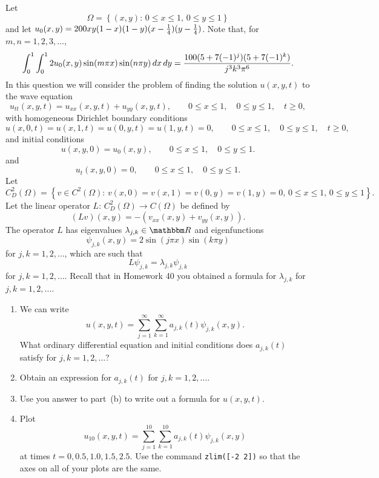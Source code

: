 Let
\[
\Omega=\left\{(x,y):\,0\le x\le 1,\,0\le y\le 1\right\}
\]
and let $u_0(x,y) = 200xy (1-x) (1-y)(x-{1 \over 4})(y-{1 \over 4})$. Note that, for $m,n=1,2,3,\ldots$,
\[
\int_0^1 \int_0^1 2 u_0(x,y) \sin(m \pi x) \sin(n \pi y)\,dx\,dy= {100 (5+7(-1)^j)(5+7(-1)^k)\over j^3 k^3 \pi^6}.
\]
In this question we will consider the problem of finding the solution $u(x,y,t)$ to the wave equation
\[ 
u_{tt}(x,y,t)=u_{xx}(x,y,t) +u_{yy}(x,y,t), \qquad 0\le x \le 1, \quad 0\le y\le 1, \quad t\ge 0,
\]
with homogeneous Dirichlet boundary conditions
\[
u(x,0,t)=u(x,1,t)=u(0,y,t)=u(1,y,t)=0, \qquad 0\le x \le 1, \quad 0\le y\le 1, \quad t\ge 0,
\]
and initial conditions
\[
u(x,y,0) = u_0(x,y), \qquad 0\le x\le 1, \quad 0\le y\le 1.
\]
and
\[
u_t(x,y,0) = 0, \qquad 0\le x\le 1, \quad 0\le y\le 1.
\]
Let
\[
C^2_D(\Omega)=\left\{v\in C^2(\Omega):\,v(x,0)=v(x,1)=v(0,y)=v(1,y)=0,\,0\le x\le 1,\,0\le y\le 1\right\}.
\]
Let the linear operator $L:\,C^2_D(\Omega)\rightarrow C(\Omega)$ be defined by
\[
\left(L v\right)(x,y) = -\left(v_{xx}(x,y) + v_{yy}(x,y)\right).
\]
The operator $L$ has eigenvalues $\lambda_{j,k}\in\R$ and eigenfunctions
\[
\psi_{j,k}(x,y) = 2 \sin(j \pi x) \sin(k \pi y)
\]
for $j,k = 1,2,\ldots$, which are such that
\[
L\psi_{j,k}=\lambda_{j,k}\psi_{j,k}
\]
for $j,k = 1,2,\ldots$. Recall that in Homework 40 you obtained a formula for $\lambda_{j,k}$ for $j,k = 1,2,\ldots$.

\begin{enumerate}
\item We can write
\[
u(x,y,t)=\sum_{j=1}^\infty \sum_{k=1}^\infty a_{j,k}(t) \psi_{j,k}(x,y).
\]
What ordinary differential equation and initial conditions does $a_{j,k}(t)$ satisfy for $j,k = 1,2,\ldots$?
\\
\item Obtain an expression for $a_{j,k}(t)$ for $j,k=1,2,\ldots$.
\\
\item Use you answer to part~(b) to write out a formula for $u(x,y,t)$.
\\
\item Plot
\[
u_{10}(x,y,t)=\sum_{j=1}^{10} \sum_{k=1}^{10} a_{j,k}(t) \psi_{j,k}(x,y)
\]
at times $t=0, 0.5, 1.0, 1.5, 2.5$. Use the command \verb|zlim([-2 2])| so that the axes on all of your plots are the same.
\end{enumerate}


